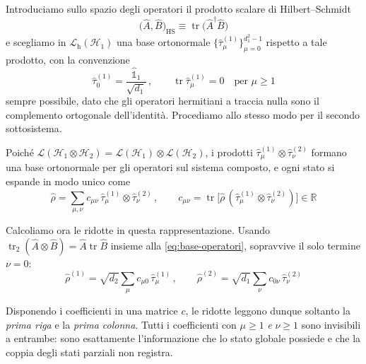 Introduciamo sullo spazio degli operatori il prodotto scalare di
Hilbert--Schmidt%
%
\begin{equation}
    \bigl( \hat{A}, \hat{B} \bigr)_{\mathrm{HS}} \equiv
    \operatorname{tr} \bigl( \hat{A}^\dagger \hat{B} \bigr)
    \label{eq:hilbert-schmidt}
\end{equation}
%
e scegliamo in $\mathcal{L}_{\mathrm{h}}(\mathcal{H}_1)$ una base
ortonormale $\{\hat{\tau}^{(1)}_\mu\}_{\mu = 0}^{d_1^2 - 1}$ rispetto a
tale prodotto, con la convenzione
%
\begin{equation}
    \hat{\tau}^{(1)}_0 = \frac{\hat{\mathbb{1}}_1}{\sqrt{d_1}} \, ,
    \qquad
    \operatorname{tr} \hat{\tau}^{(1)}_\mu = 0 \quad \text{per } \mu \geq 1
    \label{eq:base-operatori}
\end{equation}
%
sempre possibile, dato che gli operatori hermitiani a traccia nulla sono
il complemento ortogonale dell'identità. Procediamo allo stesso modo per
il secondo sottosistema.

Poiché $\mathcal{L}(\mathcal{H}_1 \otimes \mathcal{H}_2) =
\mathcal{L}(\mathcal{H}_1) \otimes \mathcal{L}(\mathcal{H}_2)$, i prodotti
$\hat{\tau}^{(1)}_\mu \otimes \hat{\tau}^{(2)}_\nu$ formano una base
ortonormale per gli operatori sul sistema composto, e ogni stato si
espande in modo unico come
%
\begin{equation}
    \hat{\rho} = \sum_{\mu, \nu} c_{\mu\nu} \,
    \hat{\tau}^{(1)}_\mu \otimes \hat{\tau}^{(2)}_\nu \, ,
    \qquad
    c_{\mu\nu} = \operatorname{tr} \bigl[ \hat{\rho} \,
    ( \hat{\tau}^{(1)}_\mu \otimes \hat{\tau}^{(2)}_\nu ) \bigr]
    \in \mathbb{R}
    \label{eq:espansione-rho}
\end{equation}

Calcoliamo ora le ridotte in questa rappresentazione. Usando
$\operatorname{tr}_2 (\hat{A} \otimes \hat{B}) = \hat{A}
\operatorname{tr} \hat{B}$ insieme alla \eqref{eq:base-operatori},
sopravvive il solo termine $\nu = 0$:
%
\begin{equation}
    \hat{\rho}^{(1)} = \sqrt{d_2} \sum_\mu c_{\mu 0} \,
    \hat{\tau}^{(1)}_\mu \, ,
    \qquad
    \hat{\rho}^{(2)} = \sqrt{d_1} \sum_\nu c_{0 \nu} \,
    \hat{\tau}^{(2)}_\nu
    \label{eq:ridotte-coefficienti}
\end{equation}

Disponendo i coefficienti in una matrice $c$, le ridotte leggono dunque
soltanto la \emph{prima riga} e la \emph{prima colonna}. Tutti i
coefficienti con $\mu \geq 1$ \emph{e} $\nu \geq 1$ sono invisibili a
entrambe: sono esattamente l'informazione che lo stato globale possiede e
che la coppia degli stati parziali non registra.

